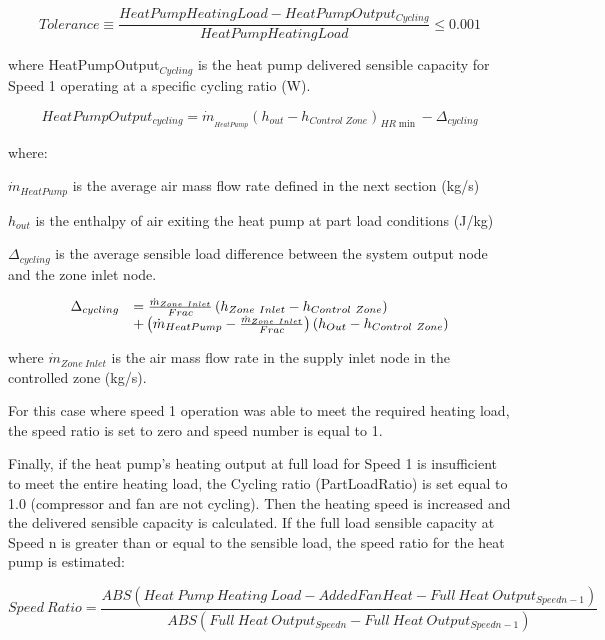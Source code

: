 \begin{equation}
  Tolerance \equiv \frac{HeatPumpHeatingLoad - HeatPumpOutput_{Cycling}}{HeatPumpHeatingLoad} \leq 0.001
\end{equation}

where HeatPumpOutput\(_{Cycling}\) is the heat pump delivered sensible capacity for Speed 1 operating at a specific cycling ratio (W).

\begin{equation}
HeatPumpOutpu{t_{cycling}} = {\dot m_{_{HeatPump}}}{\left( {{h_{out}} - {h_{Control\;Zone}}} \right)_{HR\min }} - {\Delta_{cycling}}
\end{equation}

where:

\({\dot m_{HeatPump}}\) is the average air mass flow rate defined in the next section (kg/s)

\(h_{out}\) is the enthalpy of air exiting the heat pump at part load conditions (J/kg)

\(\Delta_{cycling}\) is the average sensible load difference between the system output node and the zone inlet node.

\begin{equation}
  \begin{array}{rl}
    \Delta_{cycling} &= \frac{\dot{m}_{Zone~Inlet}}{Frac} \left(h_{Zone~Inlet} - h_{Control~Zone}\right) \\
                           &+ \left(\dot{m}_{HeatPump} - \frac{\dot{m}_{Zone~Inlet}}{Frac}\right) \left(h_{Out} - h_{Control~Zone}\right)
  \end{array}
\end{equation}

where \({{{\dot m}_{Zone~Inlet}}}\) is the air mass flow rate in the supply inlet node in the controlled zone (kg/s).

For this case where speed 1 operation was able to meet the required heating load, the speed ratio is set to zero and speed number is equal to 1.

Finally, if the heat pump's heating output at full load for Speed 1 is insufficient to meet the entire heating load, the Cycling ratio (PartLoadRatio) is set equal to 1.0 (compressor and fan are not cycling). Then the heating speed is increased and the delivered sensible capacity is calculated. If the full load sensible capacity at Speed n is greater than or equal to the sensible load, the speed ratio for the heat pump is estimated:

\begin{equation}
Speed~Ratio = \frac{{ABS(Heat~Pump~Heating~Load - AddedFanHeat - Full~Heat~Outpu{t_{Speedn-1}})}}{{ABS(Full~Heat~Outpu{t_{Speedn}} - Full~Heat~Outpu{t_{Speedn-1}})}}
\end{equation}

